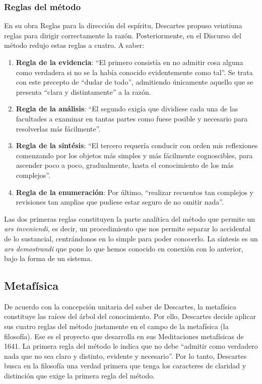 \documentclass[10pt]{article}
\begin{document}
\subsubsection{Reglas del método}

En su obra Reglas para la dirección del espíritu, Descartes propuso veintiuna reglas para dirigir correctamente la razón. Posteriormente, en el Discurso del método redujo estas
reglas a cuatro. A saber:

\begin{enumerate}
  \item \textbf{Regla de la evidencia}: ``El primero consistía en no admitir cosa alguna como verdadera si no se la había conocido evidentemente como tal''.
    Se trata con este precepto de ``dudar de todo'',
    admitiendo únicamente aquello que se presenta ``clara y distintamente'' a la razón.
  \item \textbf{Regla de la análisis}: ``El segundo exigía que dividiese cada una de las facultades a examinar en tantas partes como fuese posible y necesario para resolverlas más
    fácilmente''.
  \item \textbf{Regla de la sintésis}: ``El tercero requería conducir con orden mis reflexiones comenzando por los objetos más simples y más fácilmente cognoscibles, para ascender 
    poco a poco, gradualmente, hasta el conocimiento de los más complejos''.
  \item \textbf{Regla de la enumeración}: Por último, ``realizar recuentos tan complejos y revisiones tan amplias que pudiese estar seguro de no omitir nada''.
\end{enumerate}

Las dos primeras reglas constituyen la parte analítica del método que permite un \textit{ars inveniendi}, es decir, un procedimiento que nos permite separar lo accidental de lo
sustancial, centrándonos en lo simple para poder conocerlo. La síntesis es un \textit{ars demostrandi} que pone lo que hemos conocido en conexión con lo anterior, bajo la
forma de un sistema.

\subsection{Metafísica}

De acuerdo con la concepción unitaria del saber de Descartes, la metafísica constituye las raíces del árbol del conocimiento. Por ello, Descartes decide aplicar sus cuatro reglas
del método justamente en el campo de la metafísica (la filosofía). Ese es el proyecto que desarrolla en sus Meditaciones metafísicas de 1641. La primera regla del método le indica
que no debe ``admitir como verdadero nada que no sea claro y distinto, evidente y necesario''. Por lo tanto, Descartes busca en la filosofía una verdad primera que tenga los caracteres
de claridad y distinción que exige la primera regla del método.
\end{document}
